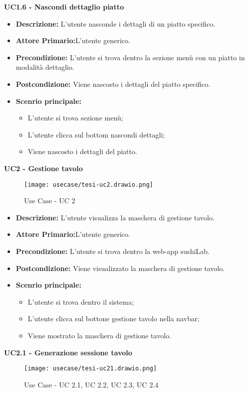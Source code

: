 \textbf{UC1.6 - Nascondi dettaglio piatto}
\begin{itemize}
    \item \textbf{Descrizione:} L'utente nasconde i dettagli di un piatto specifico.
    \item \textbf{Attore Primario:}L'utente generico.
    \item \textbf{Precondizione:} L'utente si trova dentro la sezione menù con un piatto in modalità dettaglio.
    \item \textbf{Postcondizione:} Viene nascosto i dettagli del piatto specifico.
    \item \textbf{Scenrio principale:}  
    \begin{itemize}
        \item L'utente si trova sezione menù;
        \item L'utente clicca sul bottom nascondi dettagli;
        \item Viene nascosto i dettagli del piatto.
    \end{itemize}
\end{itemize}
\textbf{UC2 - Gestione tavolo}
\begin{figure}[H]
    \centering
    \texttt{[image: usecase/tesi-uc2.drawio.png]}
    \caption{Use Case - UC 2}
\end{figure}
\begin{itemize}
    \item \textbf{Descrizione:} L'utente visualizza la maschera di gestione tavolo.
    \item \textbf{Attore Primario:}L'utente generico.
    \item \textbf{Precondizione:} L'utente si trova dentro la web-app sushiLab.
    \item \textbf{Postcondizione:} Viene visualizzato la maschera di gestione tavolo.
    \item \textbf{Scenrio principale:}
    \begin{itemize}
        \item L'utente si trova dentro il sistema;
        \item L'utente clicca sul bottone gestione tavolo nella navbar;
        \item Viene mostrato la maschera di gestione tavolo.
    \end{itemize}
\end{itemize}
\textbf{UC2.1 - Generazione sessione tavolo}
\begin{figure}[H]
    \centering
    \texttt{[image: usecase/tesi-uc21.drawio.png]}
    \caption{Use Case - UC 2.1, UC 2.2, UC 2.3, UC 2.4}
\end{figure}
